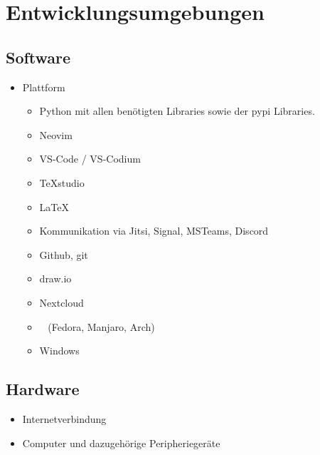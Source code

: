 \chapter{Entwicklungsumgebungen}

\section{Software}

\begin{itemize}
	\item Plattform
		\begin{itemize}
			\item Python mit allen benötigten Libraries sowie der pypi Libraries.
		\end{itemize}

		\begin{itemize}
			\item Neovim
			\item VS-Code / VS-Codium
			\item TeXstudio
			\item \LaTeX
			\item Kommunikation via Jitsi, Signal, MSTeams, Discord
			\item Github, git
			\item draw.io
			\item Nextcloud
			\item \Linux~ (Fedora, Manjaro, Arch)
			\item Windows
		\end{itemize}
\end{itemize}

\section{Hardware}

\begin{itemize}
	\item Internetverbindung
	\item Computer und dazugehörige Peripheriegeräte
\end{itemize}
